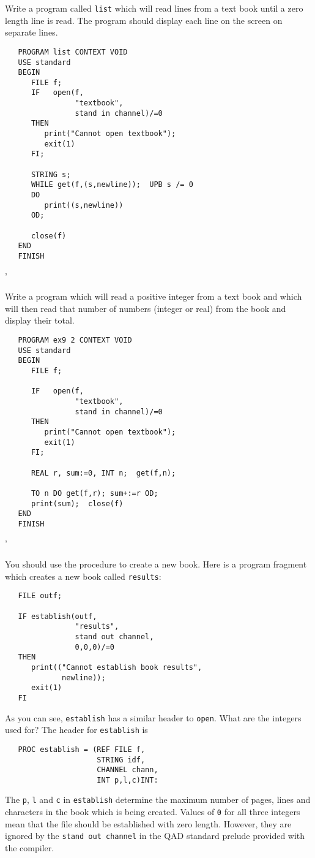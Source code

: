 \begin{exercise}
\item Write a program called \verb|list| which will read lines from a
text book until a zero length line is read.  The program should
display each line on the screen on separate lines.
\ans \ %
\begin{verbatim}
   PROGRAM list CONTEXT VOID
   USE standard
   BEGIN
      FILE f;
      IF   open(f,
                "textbook",
                stand in channel)/=0
      THEN
         print("Cannot open textbook");
         exit(1)
      FI;

      STRING s;
      WHILE get(f,(s,newline));  UPB s /= 0
      DO
         print((s,newline))
      OD;

      close(f)
   END
   FINISH
\end{verbatim}
'
\item Write a program which will read a positive integer from a text
book and which will then read that number of numbers (integer or
real) from the book and display their total.
\ans \ %
\begin{verbatim}
   PROGRAM ex9 2 CONTEXT VOID
   USE standard
   BEGIN
      FILE f;

      IF   open(f,
                "textbook",
                stand in channel)/=0
      THEN
         print("Cannot open textbook");
         exit(1)
      FI;

      REAL r, sum:=0, INT n;  get(f,n);

      TO n DO get(f,r); sum+:=r OD;
      print(sum);  close(f)
   END
   FINISH
\end{verbatim}
'
\end{exercise}

You should use the  procedure to create a new book.
Here is a program fragment which creates a new book called
\verb|results|:
\begin{verbatim}
   FILE outf;

   IF establish(outf,
                "results",
                stand out channel,
                0,0,0)/=0
   THEN
      print(("Cannot establish book results",
             newline));
      exit(1)
   FI
\end{verbatim}
\noindent
As you can see, \verb|establish| has a similar header to \texttt{open}.
What are the integers used for? The header for \verb|establish| is
\begin{verbatim}
   PROC establish = (REF FILE f,
                     STRING idf,
                     CHANNEL chann,
                     INT p,l,c)INT:
\end{verbatim}
\noindent
The \verb|p|, \verb|l| and \verb|c| in \verb|establish| determine the
maximum number of pages, lines and characters in the book which is
being created. Values of \verb|0| for all three integers mean that
the file should be established with zero length. However, they are
ignored by the \texttt{stand out channel} in the QAD standard prelude
provided with the 
compiler. 

